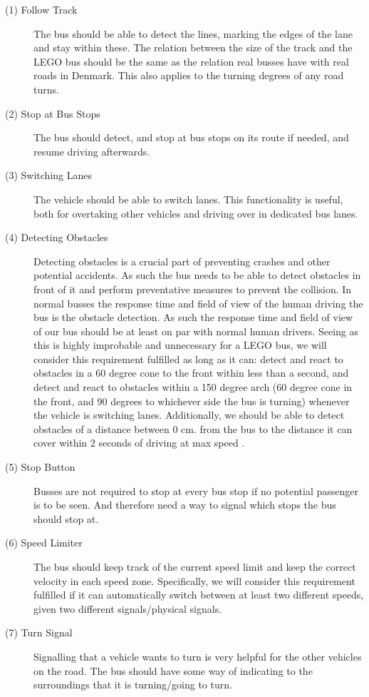 \begin{description}
    \item [(1) Follow Track]
    The bus should be able to detect the lines, marking the edges of the lane and stay within these. The relation between the size of the track and the LEGO bus should be the same as the relation real busses have with real roads in Denmark. This also applies to the turning degrees of any road turns. 
    
    \item[(2) Stop at Bus Stops]
    The bus should detect, and stop at bus stops on its route if needed, and resume driving afterwards. 

    \item[(3) Switching Lanes] 
    The vehicle should be able to switch lanes. This functionality is useful, both for overtaking other vehicles and driving over in dedicated bus lanes. 
    
    \item[(4) Detecting Obstacles]
    Detecting obstacles is a crucial part of preventing crashes and other potential accidents. As such the bus needs to be able to detect obstacles in front of it and perform preventative measures to prevent the collision. In normal busses the response time and field of view of the human driving the bus is the obstacle detection. As such the response time and field of view of our bus should be at least on par with normal human drivers. Seeing as this is highly improbable and unnecessary for a LEGO bus, we will consider this requirement fulfilled as long as it can: detect and react to obstacles in a 60 degree cone to the front within less than a second, and detect and react to obstacles within a 150 degree arch (60 degree cone in the front, and 90 degrees to whichever side the bus is turning) whenever the vehicle is switching lanes. Additionally, we should be able to detect obstacles of a distance between 0 cm. from the bus to the distance it can cover within 2 seconds of driving at max speed \cite{holdAfstand}.

    \item[(5) Stop Button]
    Busses are not required to stop at every bus stop if no potential passenger is to be seen. And therefore need a way to signal which stops the bus should stop at. 
    
    \item[(6) Speed Limiter]
    The bus should keep track of the current speed limit and keep the correct velocity in each speed zone. Specifically, we will consider this requirement fulfilled if it can automatically switch between at least two different speeds, given two different signals/physical signals. 
    
    \item[(7) Turn Signal]
    Signalling that a vehicle wants to turn is very helpful for the other vehicles on the road. The bus should have some way of indicating to the surroundings that it is turning/going to turn.
\end{description}

